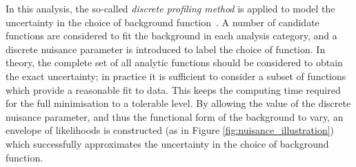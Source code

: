 In this analysis, the so-called \textit{discrete profiling method} is applied to model the uncertainty in the choice of background function~\cite{Dauncey:2014xga}. A number of candidate functions are considered to fit the background in each analysis category, and a discrete nuisance parameter is introduced to label the choice of function. In theory, the complete set of all analytic functions should be considered to obtain the exact uncertainty; in practice it is sufficient to consider a subset of functions which provide a reasonable fit to data. This keeps the computing time required for the full minimisation to a tolerable level. By allowing the value of the discrete nuisance parameter, and thus the functional form of the background to vary, an envelope of likelihoods is constructed (as in Figure \ref{fig:nuisance_illustration}) which successfully approximates the uncertainty in the choice of background function.

